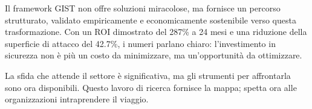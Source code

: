 Il framework GIST non offre soluzioni miracolose, ma fornisce un percorso strutturato, validato empiricamente e economicamente sostenibile verso questa trasformazione. Con un ROI dimostrato del 287\% a 24 mesi e una riduzione della superficie di attacco del 42.7\%, i numeri parlano chiaro: l'investimento in sicurezza non è più un costo da minimizzare, ma un'opportunità da ottimizzare.

La sfida che attende il settore è significativa, ma gli strumenti per affrontarla sono ora disponibili. Questo lavoro di ricerca fornisce la mappa; spetta ora alle organizzazioni intraprendere il viaggio.

\printbibliography[heading=subbibliography,title={Riferimenti Bibliografici del Capitolo}]

% 